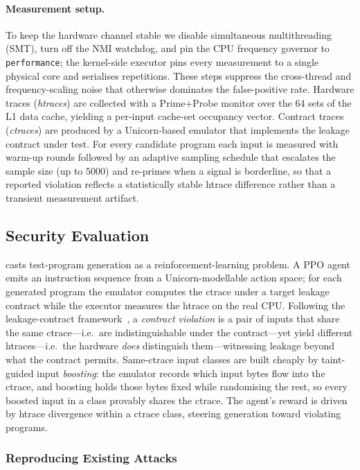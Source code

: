 \paragraph{Measurement setup.}
To keep the hardware channel stable we disable simultaneous
multithreading (SMT), turn off the NMI watchdog, and pin the CPU
frequency governor to \texttt{performance}; the kernel-side executor
pins every measurement to a single physical core and serialises
repetitions. These steps suppress the cross-thread and
frequency-scaling noise that otherwise dominates the false-positive
rate. Hardware traces (\emph{htraces}) are collected with a
Prime+Probe monitor over the 64 sets of the L1 data cache, yielding a
per-input cache-set occupancy vector. Contract traces (\emph{ctraces})
are produced by a Unicorn-based emulator that implements the leakage
contract under test. For every candidate program each input is measured
with warm-up rounds followed by an adaptive sampling schedule that
escalates the sample size (up to $5000$) and re-primes when a signal is
borderline, so that a reported violation reflects a statistically stable
htrace difference rather than a transient measurement artifact.

\subsection{Security Evaluation}
\label{sec:eval:security}

\tool casts test-program generation as a reinforcement-learning
problem. A PPO agent emits an instruction sequence from a
Unicorn-modellable action space; for each generated program the
emulator computes the ctrace under a target leakage
contract while the executor measures the htrace on the real CPU.
Following the leakage-contract framework~\cite{contracts,revizor}, a
\emph{contract violation} is a pair of inputs that share the same
ctrace---i.e.\ are indistinguishable under the contract---yet yield
different htraces---i.e.\ the hardware \emph{does} distinguish
them---witnessing leakage beyond what the contract permits.
Same-ctrace input classes are built cheaply by taint-guided input
\emph{boosting}: the emulator records which input bytes flow into the
ctrace, and boosting holds those bytes fixed while randomising the
rest, so every boosted input in a class provably shares the ctrace.
The agent's reward is driven by htrace divergence within a ctrace
class, steering generation toward violating programs.

\subsubsection{Reproducing Existing Attacks}
\label{sec:eval:repro}

